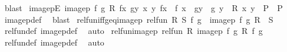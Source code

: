 \begin{isabellebody}
\ blast%
\endisatagproof
{\isafoldproof}%
%
\isadelimproof
\isanewline
%
\endisadelimproof
\isanewline
{}\isamarkupfalse%
\ image{}pE{\isacharcolon}{\kern0pt}\ {\isachardoublequoteopen}{\isasymlbrakk}image{}p\ f\ g\ R\ fx\ gy{\isacharsemicolon}{\kern0pt}\ {\isacharparenleft}{\kern0pt}{\isasymAnd}x\ y{\isachardot}{\kern0pt}\ fx\ {\isacharequal}{\kern0pt}\ f\ x\ {\isasymLongrightarrow}\ gy\ {\isacharequal}{\kern0pt}\ g\ y\ {\isasymLongrightarrow}\ R\ x\ y\ {\isasymLongrightarrow}\ P{\isacharparenright}{\kern0pt}{\isasymrbrakk}\ {\isasymLongrightarrow}\ P{\isachardoublequoteclose}\isanewline
%
\isadelimproof
\ \ %
\endisadelimproof
%
\isatagproof
{}\isamarkupfalse%
\ image{}p{\isacharunderscore}{\kern0pt}def\ \isamarkupfalse%
\ blast%
\endisatagproof
{\isafoldproof}%
%
\isadelimproof
\isanewline
%
\endisadelimproof
\isanewline
{}\isamarkupfalse%
\ rel{\isacharunderscore}{\kern0pt}fun{\isacharunderscore}{\kern0pt}iff{\isacharunderscore}{\kern0pt}geq{\isacharunderscore}{\kern0pt}image{}p{\isacharcolon}{\kern0pt}\ {\isachardoublequoteopen}rel{\isacharunderscore}{\kern0pt}fun\ R\ S\ f\ g\ {\isacharequal}{\kern0pt}\ {\isacharparenleft}{\kern0pt}image{}p\ f\ g\ R\ {\isasymle}\ S{\isacharparenright}{\kern0pt}{\isachardoublequoteclose}\isanewline
%
\isadelimproof
\ \ %
\endisadelimproof
%
\isatagproof
{}\isamarkupfalse%
\ rel{\isacharunderscore}{\kern0pt}fun{\isacharunderscore}{\kern0pt}def\ image{}p{\isacharunderscore}{\kern0pt}def\ \isamarkupfalse%
\ auto%
\endisatagproof
{\isafoldproof}%
%
\isadelimproof
\isanewline
%
\endisadelimproof
\isanewline
{}\isamarkupfalse%
\ rel{\isacharunderscore}{\kern0pt}fun{\isacharunderscore}{\kern0pt}image{}p{\isacharcolon}{\kern0pt}\ {\isachardoublequoteopen}rel{\isacharunderscore}{\kern0pt}fun\ R\ {\isacharparenleft}{\kern0pt}image{}p\ f\ g\ R{\isacharparenright}{\kern0pt}\ f\ g{\isachardoublequoteclose}\isanewline
%
\isadelimproof
\ \ %
\endisadelimproof
%
\isatagproof
{}\isamarkupfalse%
\ rel{\isacharunderscore}{\kern0pt}fun{\isacharunderscore}{\kern0pt}def\ image{}p{\isacharunderscore}{\kern0pt}def\ \isamarkupfalse%
\ auto%
\endisatagproof
{\isafoldproof}%
%
\isadelimproof
%
\endisadelimproof
%
\isadelimdocument
%
\endisadelimdocument
%
\isatagdocument
%
\isamarkuptrue%
%
\endisatagdocument

\end{isabellebody}
